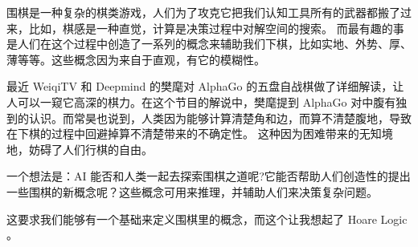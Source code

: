 

围棋是一种复杂的棋类游戏，人们为了攻克它把我们认知工具所有的武器都搬了过来，比如，棋感是一种直觉，计算是决策过程中对解空间的搜索。
而最有趣的事是人们在这个过程中创造了一系列的概念来辅助我们下棋，比如实地、外势、厚、薄等等。这些概念因为来自于直观，有它的模糊性。

最近 WeiqiTV 和 Deepmind 的樊麾对 AlphaGo 的五盘自战棋做了详细解读，让人可以一窥它高深的棋力。在这个节目的解说中，樊麾提到 AlphaGo
对中腹有独到的认识。而常昊也说到，人类因为能够计算清楚角和边，而算不清楚腹地，导致在下棋的过程中回避掉算不清楚带来的不确定性。
这种因为困难带来的无知境地，妨碍了人们行棋的自由。

一个想法是：AI 能否和人类一起去探索围棋之道呢?它能否帮助人们创造性的提出一些围棋的新概念呢？这些概念可用来推理，并辅助人们来决策复杂问题。

这要求我们能够有一个基础来定义围棋里的概念，而这个让我想起了 Hoare Logic 。








